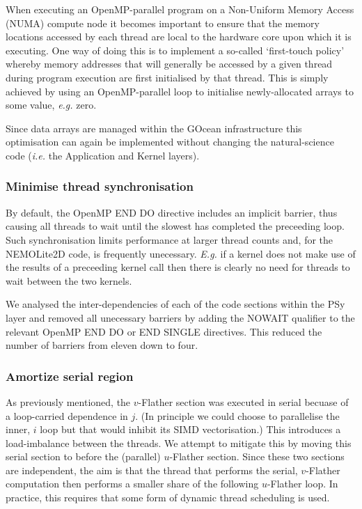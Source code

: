 \documentclass[gmdd, manuscript]{copernicus}
\begin{document}
When executing an OpenMP-parallel program on a Non-Uniform Memory
Access (NUMA) compute node it becomes important to ensure that the
memory locations accessed by each thread are local to the hardware
core upon which it is executing. One way of doing this is to implement
a so-called `first-touch policy' whereby memory addresses that will
generally be accessed by a given thread during program execution are
first initialised by that thread. This is simply achieved by using an
OpenMP-parallel loop to initialise newly-allocated arrays to some
value, \textit{e.g.} zero.

Since data arrays are managed within the GOcean infrastructure this
optimisation can again be implemented without changing the
natural-science code (\textit{i.e.} the Application and Kernel layers).

\subsubsection{Minimise thread synchronisation}
\label{sec_synch}

By default, the OpenMP END DO directive includes an implicit barrier,
thus causing all threads to wait until the slowest has completed the
preceeding loop. Such synchronisation limits performance at larger
thread counts and, for the NEMOLite2D code, is frequently unecessary.
\textit{E.g.} if a kernel does not make use of the results of a
preceeding kernel call then there is clearly no need for threads to
wait between the two kernels.

We analysed the inter-dependencies of each of the code sections within
the PSy layer and removed all unecessary barriers by adding the NOWAIT
qualifier to the relevant OpenMP END DO or END SINGLE directives. This
reduced the number of barriers from eleven down to four.

\subsubsection{Amortize serial region}
\label{sec_amortize}

As previously mentioned, the $v$-Flather section was executed in
serial becuase of a loop-carried dependence in $j$. (In principle we
could choose to parallelise the inner, $i$ loop but that would inhibit
its SIMD vectorisation.) This introduces a load-imbalance between the
threads. We attempt to mitigate this by moving this serial section to
before the (parallel) $u$-Flather section. Since these two sections are
independent, the aim is that the thread that performs the serial,
$v$-Flather computation then performs a smaller share of the following
$u$-Flather loop. In practice, this requires that some form of dynamic
thread scheduling is used.
\end{document}
